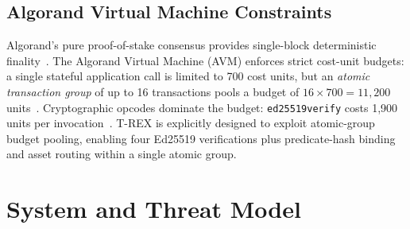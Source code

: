 \documentclass[journal]{IEEEtran}
\begin{document}
\subsection{Algorand Virtual Machine Constraints}
Algorand's pure proof-of-stake consensus provides single-block deterministic finality~\cite{gilad2017algorand}. The Algorand Virtual Machine (AVM) enforces strict cost-unit budgets: a single stateful application call is limited to 700 cost units, but an \emph{atomic transaction group} of up to 16 transactions pools a budget of $16 \times 700 = 11{,}200$ units~\cite{algorand_costs}. Cryptographic opcodes dominate the budget: \texttt{ed25519verify} costs 1,900 units per invocation~\cite{algorand_costs}. T-REX is explicitly designed to exploit atomic-group budget pooling, enabling four Ed25519 verifications plus predicate-hash binding and asset routing within a single atomic group.

\begin{table}[t]
\centering
\caption{Comparison of Settlement Protocols for Agentic Commerce}
\label{tab:comparison}
\end{table}

\section{System and Threat Model}
\label{sec:model}
\end{document}
